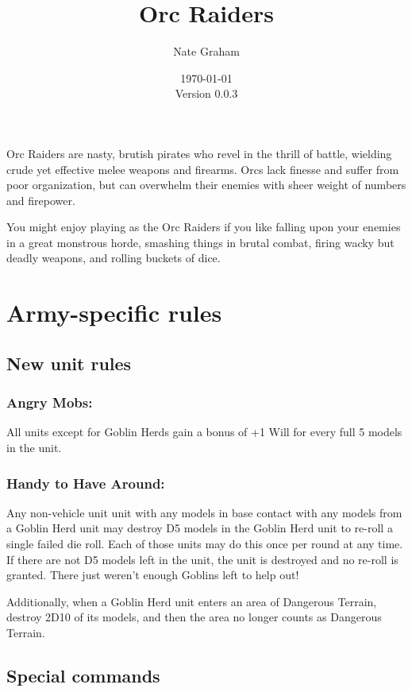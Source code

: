 \documentclass[landscape]{extarticle}
\begin{document}
\title{Orc Raiders}
\author{Nate Graham}
\date{\today\\ Version 0.0.3}

\maketitle

Orc Raiders are nasty, brutish pirates who revel in the thrill of battle, wielding crude yet effective melee weapons and firearms. Orcs lack finesse and suffer from poor organization, but can overwhelm their enemies with sheer weight of numbers and firepower.

You might enjoy playing as the Orc Raiders if you like falling upon your enemies in a great monstrous horde, smashing things in brutal combat, firing wacky but deadly weapons, and rolling buckets of dice.

\section*{Army-specific rules}

\subsection*{New unit rules}

\subsubsection*{Angry Mobs:} All units except for Goblin Herds gain a bonus of +1 Will for every full 5 models in the unit.

\subsubsection*{Handy to Have Around:} Any non-vehicle unit unit with any models in base contact with any models from a Goblin Herd unit may destroy D5 models in the Goblin Herd unit to re-roll a single failed die roll. Each of those units may do this once per round at any time. If there are not D5 models left in the unit, the unit is destroyed and no re-roll is granted. There just weren't enough Goblins left to help out!

Additionally, when a Goblin Herd unit enters an area of Dangerous Terrain, destroy 2D10 of its models, and then the area no longer counts as Dangerous Terrain.

\subsection*{Special commands}
\end{document}
